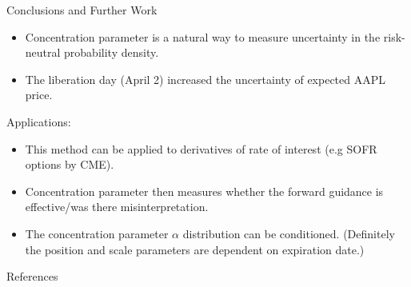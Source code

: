 \documentclass[10pt,aspectratio=43]{beamer}
\begin{document}
\begin{frame}{Conclusions and Further Work}
    \begin{itemize}
        \item Concentration parameter is a natural way to measure uncertainty in the risk-neutral probability density.
        \item The liberation day (April 2) increased the uncertainty of expected AAPL price.
    \end{itemize}

Applications:\vspace{-3ex}
\begin{itemize}
    \item This method can be applied to derivatives of rate of interest (e.g SOFR options by CME).
    \item Concentration parameter then measures whether the forward guidance is effective/was there misinterpretation.
\end{itemize}
\begin{itemize}
    \item The concentration parameter $\alpha$ distribution can be conditioned. (Definitely the position and scale parameters are dependent on expiration date.)
\end{itemize}

\end{frame}



\lastslide

\begin{frame}[allowframebreaks]{References}
    \renewcommand*{\bibfont}{\scriptsize}
    \printbibliography
\end{frame}


    
\end{document}

